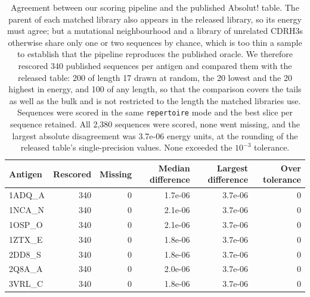 \documentclass[11pt,a4paper]{article}
\begin{document}
\begin{table}[h]
\caption{Agreement between our scoring pipeline and the published Absolut! table. The parent of each matched library also appears in the released library, so its energy must agree; but a mutational neighbourhood and a library of unrelated CDRH3s otherwise share only one or two sequences by chance, which is too thin a sample to establish that the pipeline reproduces the published oracle. We therefore rescored 340 published sequences per antigen and compared them with the released table: 200 of length 17 drawn at random, the 20 lowest and the 20 highest in energy, and 100 of any length, so that the comparison covers the tails as well as the bulk and is not restricted to the length the matched libraries use. Sequences were scored in the same \texttt{repertoire} mode and the best slice per sequence retained. All 2,380 sequences were scored, none went missing, and the largest absolute disagreement was 3.7e-06 energy units, at the rounding of the released table's single-precision values. None exceeded the $10^{-3}$ tolerance.}
\centering
\begin{tabular}{@{}lrrrrr@{}}
\toprule
Antigen & Rescored & Missing & Median difference & Largest difference & Over tolerance \\
\midrule
1ADQ\_A & 340 & 0 & 1.7e-06 & 3.7e-06 & 0 \\
1NCA\_N & 340 & 0 & 2.1e-06 & 3.7e-06 & 0 \\
1OSP\_O & 340 & 0 & 2.1e-06 & 3.7e-06 & 0 \\
1ZTX\_E & 340 & 0 & 1.8e-06 & 3.7e-06 & 0 \\
2DD8\_S & 340 & 0 & 1.8e-06 & 3.7e-06 & 0 \\
2Q8A\_A & 340 & 0 & 2.0e-06 & 3.7e-06 & 0 \\
3VRL\_C & 340 & 0 & 1.8e-06 & 3.7e-06 & 0 \\
\bottomrule
\end{tabular}
\end{table}
\end{document}
